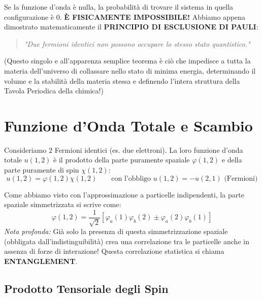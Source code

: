 \documentclass[11pt, a4paper]{article}
\begin{document}
\noindent
Se la funzione d'onda è nulla, la probabilità di trovare il sistema in quella configurazione è $0$. \textbf{È FISICAMENTE IMPOSSIBILE!} %
Abbiamo appena dimostrato matematicamente il \textbf{PRINCIPIO DI ESCLUSIONE DI PAULI}: %
\begin{quote}
    \textit{"Due fermioni identici non possono occupare lo stesso stato quantistico."} %
\end{quote}
(Questo singolo e all'apparenza semplice teorema è ciò che impedisce a tutta la materia dell'universo di collassare nello stato di minima energia, determinando il volume e la stabilità della materia stessa e definendo l'intera struttura della Tavola Periodica della chimica!) %

\section{Funzione d'Onda Totale e Scambio} %

Consideriamo $2$ Fermioni identici (es. due elettroni). La loro funzione d'onda totale $u(1,2)$ è il prodotto della parte puramente spaziale $\varphi(1,2)$ e della parte puramente di spin $\chi(1,2)$: %
\begin{equation}
    u(1,2) = \varphi(1,2) \chi(1,2) \qquad \text{con l'obbligo } u(1,2) = -u(2,1) \text{ (Fermioni)} %
\end{equation}

\noindent
Come abbiamo visto con l'approssimazione a particelle indipendenti, la parte spaziale simmetrizzata si scrive come: %
\begin{equation*}
    \varphi(1,2) = \frac{1}{\sqrt{2}} \left[ \varphi_a(1)\varphi_b(2) \pm \varphi_a(2)\varphi_b(1) \right] %
\end{equation*}
\textit{Nota profonda:} Già solo la presenza di questa simmetrizzazione spaziale (obbligata dall'indistinguibilità) crea una correlazione tra le particelle anche in assenza di forze di interazione! Questa correlazione statistica si chiama \textbf{ENTANGLEMENT}. %

\subsection{Prodotto Tensoriale degli Spin} %
\end{document}
